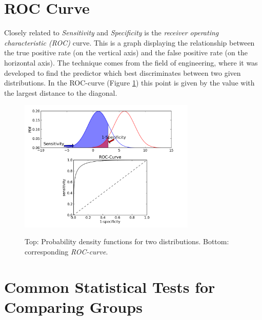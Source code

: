 \section{ROC Curve}

Closely related to \emph{Sensitivity} and \emph{Specificity} is the \emph{receiver operating characteristic (ROC)} curve. This is a graph displaying the relationship between the true positive rate (on the vertical axis) and the false positive rate (on the horizontal axis). The technique comes from the field of engineering, where it was developed to find the predictor which best discriminates between two given distributions. In the ROC-curve (Figure \ref{fig:ROC}) this point is given by the value with the largest distance to the diagonal.

\begin{figure}[ht]
  \centering
  \includegraphics[width=0.75\textwidth]{../Images/ROC.png}\\
  \caption{Top: Probability density functions for two distributions. Bottom: corresponding \emph{ROC-curve}.}\label{fig:ROC}
\end{figure}

\section{Common Statistical Tests for Comparing Groups}

